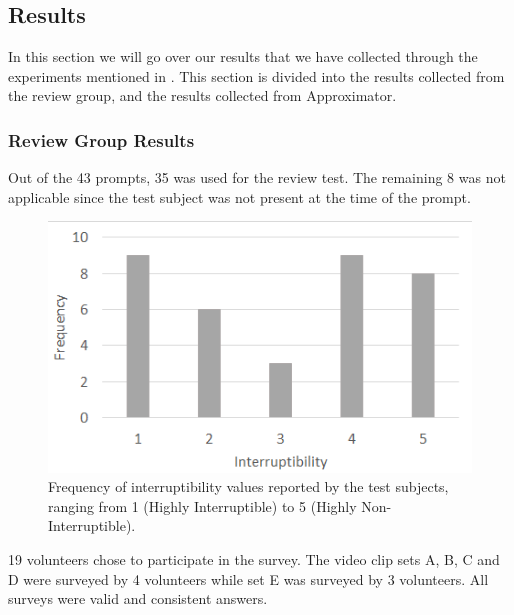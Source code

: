 \documentclass{sigchi}
\begin{document}
\subsection{Results}
In this section we will go over our results that we have collected through the experiments mentioned in .
This section is divided into the results collected from the review group, and the results collected from Approximator.

\subsubsection{Review Group Results}
Out of the 43 prompts, 35 was used for the review test.
The remaining 8 was not applicable since the test subject was not present at the time of the prompt.

\begin{figure}
  \centering
  \includegraphics[width=\columnwidth]{figures/Interruptibility_values_videotest.png}
  \caption{Frequency of interruptibility values reported by the test subjects, ranging from 1 (Highly Interruptible) to 5 (Highly Non-Interruptible).}
  \label{fig:interruptibilityFrequency}
\end{figure}

19 volunteers chose to participate in the survey.
The video clip sets A, B, C and D were surveyed by 4 volunteers while set E was surveyed by 3 volunteers.
All surveys were valid and consistent answers.
\end{document}
